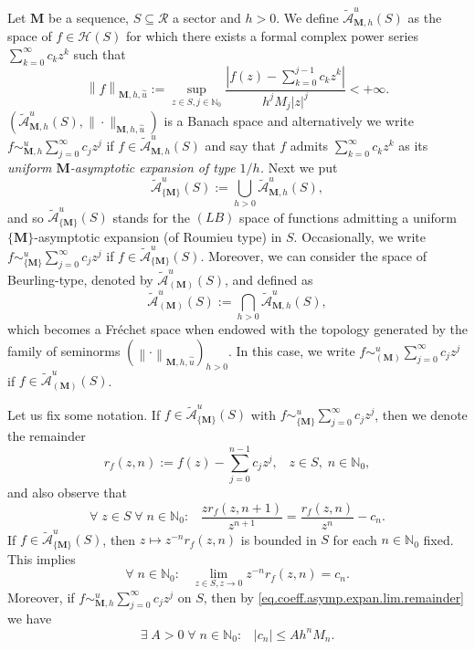 \documentclass[11pt,a4paper]{article}
\theoremstyle{plain}
\theoremstyle{definition}
\newcommand{\NN}{\mathbb{N}}
\newcommand{\M}{\mathbf{M}}
\newcommand{\LL}{\mathbf{L}}
\begin{document}
Let $\M$ be a sequence, $S\subseteq\mathcal{R}$ a sector and $h>0$. We define
$\mathcal{\widetilde{A}}^{u}_{\M,h}(S)$ as the space of $f\in\mathcal{H}(S)$ for which there exists a formal complex power series $\sum_{k=0}^{\infty}c_kz^k$ such that 
\[
\left\|f\right\|_{\M,h,\overset{\sim}{u}}:=\sup_{z\in S,j\in\NN_{0}}\frac{|f(z)-\sum_{k=0}^{j-1}c_kz^k|}{h^{j}M_{j}|z|^j}<+\infty.
\]
$(\mathcal{\widetilde{A}}^{u}_{\M,h}(S),\|\cdot\|_{\M,h,\overset{\sim}{u}})$ is a Banach space and alternatively we write $f\sim^u_{\M,h} \sum_{j=0}^\infty c_j z^j$ if $f\in\mathcal{\widetilde{A}}^{u}_{\M,h}(S)$ and say that $f$ admits $\sum_{k=0}^{\infty}c_kz^k$ as its \emph{uniform $\M$-asymptotic expansion of type $1/h$.} Next we put
\begin{equation*}%
		 \mathcal{\widetilde{A}}^{u}_{\{\M\}}(S):=\bigcup_{h>0}\mathcal{\widetilde{A}}^{u}_{\M,h}(S),
\end{equation*}
and so $\widetilde{\mathcal{A}}^u_{\{\M\}}(S)$ stands for the $(LB)$ space of functions admitting a uniform $\{\M\}$-asymptotic expansion (of Roumieu type) in $S$. Occasionally, we write $f\sim^u_{\{\M\}} \sum_{j=0}^\infty c_j z^j$ if $f\in\widetilde{\mathcal{A}}^u_{\{\M\}}(S)$. Moreover, we can consider the space of Beurling-type, denoted by $\widetilde{\mathcal{A}}^u_{(\M)}(S)$, and defined as
$$
\widetilde{\mathcal{A}}^u_{(\M)}(S):=\bigcap_{h>0}\widetilde{\mathcal{A}}^u_{\M,h}(S),
$$
which becomes a Fr\'echet space when endowed with the topology generated by the family of seminorms $(\left\|\cdot\right\|_{\M,h,\overset{\sim}{u}})_{h>0}$. In this case, we write $f\sim^u_{(\M)} \sum_{j=0}^\infty c_j z^j$ if $f\in\widetilde{\mathcal{A}}^u_{(\M)}(S)$.

Let us fix some notation. If $f\in \widetilde{\mathcal{A}}^u_{\{\M\}} (S)$  with $f\sim^u_{\{\M\}} \sum_{j=0}^\infty c_j z^j$, then we denote the remainder
\begin{equation*}%
	r_{f}(z,n):= f(z)-\sum_{j=0}^{n-1} c_j z^j,\;\;\;z\in S,\;n\in\NN_0,
\end{equation*}
and also observe that
\begin{equation*}%
	\forall\;z\in S\;\forall\;n\in\NN_0:\;\;\; \frac{zr_f(z,n+1)}{z^{n+1}}=\frac{r_f(z,n)}{z^{n}}-c_n.
\end{equation*}
If $f\in\widetilde{\mathcal{A}}^u_{\{\M\}} (S)$, then $z\mapsto z^{-n}r_f(z,n)$ is bounded in $S$ for each $n\in\NN_0$ fixed. This implies
\begin{equation}\label{eq.coeff.asymp.expan.lim.remainder}
    \forall\;n\in\NN_0:\;\;\;\lim_{z\in S,z\rightarrow 0} z^{-n}r_f(z,n)=c_n.
\end{equation}
Moreover, if $f\sim^u_{\M,h} \sum_{j=0}^\infty c_j z^j$ on $S$, then by \eqref{eq.coeff.asymp.expan.lim.remainder} we have
\begin{equation}\label{cjestimation}
	\exists\;A>0\;\forall\;n\in\NN_0:\;\;\;|c_n|\le Ah^nM_n.
\end{equation}
\end{document}
